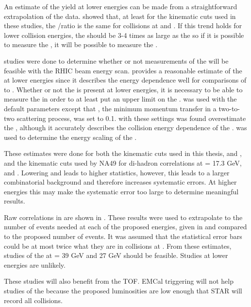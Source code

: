 An estimate of the \ridge yield at lower energies can be made from a straightforward extrapolation of the data.   showed that, at least for the kinematic cuts used in these studies, the \nridge/\njet ratio is the same for collisions at \sNNsixtytwo and \sNNtwohundred.  If this trend holds for lower collision energies, the \ridge should be 3-4 times as large as the \jlc so if it is possible to measure the \jlc, it will be possible to measure the \ridge.

\py studies were done to determine whether or not measurements of the \ridge will be feasible with the RHIC beam energy scan.  \py provides a reasonable estimate of the \jlc at lower energies since it describes the energy dependence well for comparisons of \sNNsixtytwo to \sNNtwohundred.  Whether or not the \ridge is present at lower energies, it is necessary to be able to measure the \jlc in order to at least put an upper limit on the \ry.   was used with the default parameters except that \pthatmin, the minimum momentum transfer in  a two-to-two scattering process, was set to 0.1.   with these settings was found overestimate the \jly, although it accurately describes the collision energy dependence of the \jly.  \py was used to determine the energy scaling of the \jly.

These estimates were done for both the kinematic cuts used in this thesis, \stdtrig and \stdassoc, and the kinematic cuts used by NA49 for di-hadron correlations at \sNN = 17.3 GeV,  and  \cite{Szuba:2008ss,Szuba:2008dx}.  Lowering \ptassoc and \pttrig leads to higher statistics, however, this leads to a larger combinatorial background and therefore increases systematic errors.  At higher energies this may make the systematic error too large to determine meaningful results.

Raw correlations in \py are shown in .  These results were used to extrapolate to the number of events needed at each of the proposed energies, given in  and compared to the proposed number of events.  It was assumed that the statistical error bars could be at most twice what they are in \Au collisions at \sNNsixtytwo.  From these estimates, studies of the \ridge at \sNN = 39 GeV and 27 GeV should be feasible.  Studies at lower energies are unlikely.

These studies will also benefit from the TOF.  EMCal triggering will not help studies of the \ridge because the proposed luminosities are low enough that STAR will record all collisions.

